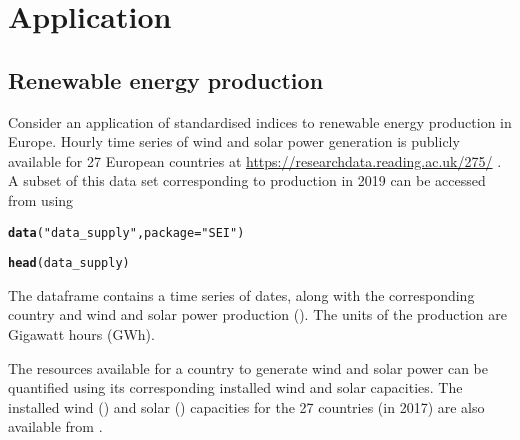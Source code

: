 \documentclass[article,shortnames,nojss]{jss}\usepackage[]{graphicx}\usepackage[]{xcolor}
\makeatletter
\newcommand{\hlstr}[1]{\textcolor[rgb]{0.192,0.494,0.8}{#1}}%
\newcommand{\hlstd}[1]{\textcolor[rgb]{0.345,0.345,0.345}{#1}}%
\newcommand{\hlkwc}[1]{\textcolor[rgb]{0.333,0.667,0.333}{#1}}%
\newcommand{\hlkwd}[1]{\textcolor[rgb]{0.737,0.353,0.396}{\textbf{#1}}}%
\newenvironment{kframe}{%
 \def\at@end@of@kframe{}%
 \ifinner\ifhmode%
  \def\at@end@of@kframe{\end{minipage}}%
  \begin{minipage}{\columnwidth}%
 \fi\fi%
 \def\FrameCommand##1{\hskip\@totalleftmargin \hskip-\fboxsep
 \colorbox{shadecolor}{##1}\hskip-\fboxsep
     \hskip-\linewidth \hskip-\@totalleftmargin \hskip\columnwidth}%
 \MakeFramed {\advance\hsize-\width
   \@totalleftmargin\z@ \linewidth\hsize
   \@setminipage}}%
 {\par\unskip\endMakeFramed%
 \at@end@of@kframe}
\newenvironment{knitrout}{}{} %
\makeatother
\begin{document}
\section{Application}\label{section:application}

\subsection{Renewable energy production}

Consider an application of standardised indices to renewable energy production in Europe. Hourly time series of wind and solar power generation is publicly available for 27 European countries at \url{https://researchdata.reading.ac.uk/275/} \citep[see][for details]{BloomfieldEtAl2020}. A subset of this data set corresponding to production in 2019 can be accessed from  using

\begin{knitrout}
\color{fgcolor}\begin{kframe}
\begin{alltt}
\hlkwd{data}\hlstd{(}\hlstr{"data_supply"}\hlstd{,} \hlkwc{package} \hlstd{=} \hlstr{"SEI"}\hlstd{)}
\end{alltt}


{\ttfamily\noindent\bfseries\color{errorcolor}{\#\# Error in find.package(package, lib.loc, verbose = verbose): there is no package called 'SEI'}}\begin{alltt}
\hlkwd{head}\hlstd{(data_supply)}
\end{alltt}


{\ttfamily\noindent\bfseries\color{errorcolor}{\#\# Error in eval(expr, envir, enclos): object 'data\_supply' not found}}\end{kframe}
\end{knitrout}

The dataframe  contains a  time series of dates, along with the corresponding country and wind and solar power production (). The units of the production are Gigawatt hours (GWh).

The resources available for a country to generate wind and solar power can be quantified using its corresponding installed wind and solar capacities. The installed wind () and solar () capacities for the 27 countries (in 2017) are also available from .
\end{document}
